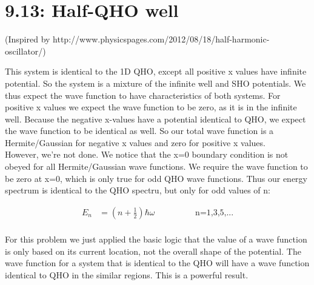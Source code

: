 \documentclass[10pt]{article} %
\begin{document}

\section{9.13: Half-QHO well}
(Inspired by http://www.physicspages.com/2012/08/18/half-harmonic-oscillator/)

This system is identical to the 1D QHO, except all positive x values have infinite
potential. So the system is a mixture of the infinite well and SHO potentials. We
thus expect the wave function to have characteristics of both systems. For positive
x values we expect the wave function to be zero, as it is in the infinite well.
Because the negative x-values have a potential identical to QHO, we expect the wave
function to be identical as well. So our total wave function is a Hermite/Gaussian
for negative x values and zero for positive x values.\\

However, we're not done. We notice that the x=0 boundary condition is not obeyed
for all Hermite/Gaussian wave functions. We require the wave function to be zero
at x=0, which is only true for odd QHO wave functions. Thus our energy spectrum
is identical to the QHO spectru, but only for odd values of n:

\begin{align*}
  E_n &= \left(n + \frac{1}{2}\right)\hbar\omega\hspace{2cm}\mbox{n=1,3,5,...}\\
\end{align*}

For this problem we just applied the basic logic that the value of a wave function
is only based on its current location, not the overall shape of the potential. The
wave function for a system that is identical to the QHO will have a wave function
identical to QHO in the similar regions. This is a powerful result.\\
\end{document}
